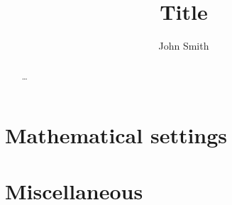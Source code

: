 \documentclass[12pt,a4paper,reqno]{amsart}
\title{Title}
\author{John Smith}
\date{\Rd{\textbf{\today}}}
\numberwithin{equation}{section}
\theoremstyle{definition}
\theoremstyle{plain}
\theoremstyle{remark}
\begin{document}
\begin{abstract}
    \ldots
\end{abstract}

\maketitle

\setcounter{tocdepth}{2}
\tableofcontents


\section{Mathematical settings}


\appendix

\section{Miscellaneous}


%
%
\end{document}
